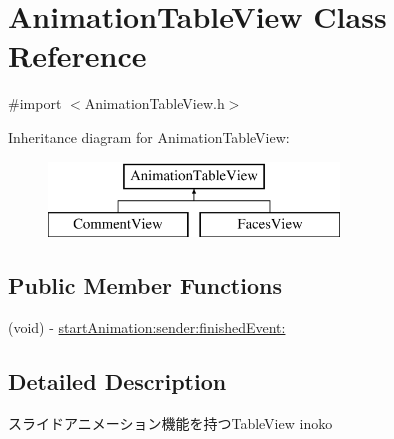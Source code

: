 \hypertarget{interface_animation_table_view}{
\section{AnimationTableView Class Reference}
\label{interface_animation_table_view}
}


{\ttfamily \#import $<$AnimationTableView.h$>$}

Inheritance diagram for AnimationTableView:\begin{figure}[H]
\begin{center}
\leavevmode
\includegraphics[height=2.000000cm]{interface_animation_table_view}
\end{center}
\end{figure}
\subsection*{Public Member Functions}
\begin{DoxyCompactItemize}
\item 
(void) -\/ \hyperlink{interface_animation_table_view_a86e0b1d9d7f4169e19d2fa24f10ef599}{startAnimation:sender:finishedEvent:}
\end{DoxyCompactItemize}


\subsection{Detailed Description}
スライドアニメーション機能を持つTableView  inoko 

